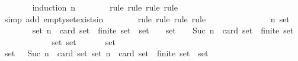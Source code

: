 \begin{isabellebody}
\ \ \ \ \ \ \isamarkupfalse%
\ {\isacharparenleft}induction\ n{\isacharparenright}\isanewline
\ \ \ \ \ \ \isamarkupfalse%
\ {\isacharparenleft}rule{\isacharcomma}\ rule{\isacharcomma}\ rule{\isacharcomma}\ rule{\isacharparenright}\isanewline
\ \ \ \ \ \ \ \isamarkupfalse%
\ {\isacharparenleft}simp\ add{\isacharcolon}\ empty{\isacharunderscore}set{\isacharunderscore}exists{\isacharunderscore}in{\isacharunderscore}{\isasymSigma}{\isacharparenright}\isanewline
\ \ \ \ \ \ \isamarkupfalse%
\ {\isacharparenleft}rule{\isacharcomma}\ rule{\isacharcomma}\ rule{\isacharcomma}\ rule{\isacharparenright}\isanewline
\ \ \ \ \isamarkupfalse%
\ {\isacharminus}\ \isanewline
\ \ \ \ \ \ \isamarkupfalse%
\ n\ {\isasymsigma}{\isacharunderscore}set\isanewline
\ \ \ \ \ \ \isamarkupfalse%
\ {\isachardoublequoteopen}{\isasymforall}{\isasymsigma}{\isacharunderscore}set{\isasymsubseteq}{\isasymSigma}{\isachardot}\ n\ {\isacharequal}\ card\ {\isasymsigma}{\isacharunderscore}set\ {\isasymlongrightarrow}\ finite\ {\isasymsigma}{\isacharunderscore}set\ {\isasymlongrightarrow}\ {\isasymUnion}{\isasymsigma}{\isacharunderscore}set\ {\isasymin}\ {\isasymSigma}{\isachardoublequoteclose}\ \ {\isachardoublequoteopen}{\isasymsigma}{\isacharunderscore}set\ {\isasymsubseteq}\ {\isasymSigma}{\isachardoublequoteclose}\ \ {\isachardoublequoteopen}Suc\ n\ {\isacharequal}\ card\ {\isasymsigma}{\isacharunderscore}set{\isachardoublequoteclose}\ \ {\isachardoublequoteopen}finite\ {\isasymsigma}{\isacharunderscore}set{\isachardoublequoteclose}\ \isanewline
\ \ \ \ \ \ \isamarkupfalse%
\ \isamarkupfalse%
\ {\isachardoublequoteopen}{\isasymforall}\ {\isasymsigma}\ {\isasymin}\ {\isasymsigma}{\isacharunderscore}set{\isachardot}\ {\isasymsigma}{\isacharunderscore}set\ {\isacharminus}\ {\isacharbraceleft}{\isasymsigma}{\isacharbraceright}\ {\isasymsubseteq}\ {\isasymSigma}\ {\isasymand}\ {\isasymUnion}\ {\isacharparenleft}{\isasymsigma}{\isacharunderscore}set\ {\isacharminus}\ {\isacharbraceleft}{\isasymsigma}{\isacharbraceright}{\isacharparenright}\ {\isasymin}\ {\isasymSigma}{\isachardoublequoteclose}\isanewline
\ \ \ \ \ \ \ \ \isamarkupfalse%
\ {\isacartoucheopen}{\isasymsigma}{\isacharunderscore}set\ {\isasymsubseteq}\ {\isasymSigma}{\isacartoucheclose}\ {\isacartoucheopen}Suc\ n\ {\isacharequal}\ card\ {\isasymsigma}{\isacharunderscore}set{\isacartoucheclose}\ {\isacartoucheopen}{\isasymforall}{\isasymsigma}{\isacharunderscore}set{\isasymsubseteq}{\isasymSigma}{\isachardot}\ n\ {\isacharequal}\ card\ {\isasymsigma}{\isacharunderscore}set\ {\isasymlongrightarrow}\ finite\ {\isasymsigma}{\isacharunderscore}set\ {\isasymlongrightarrow}\ {\isasymUnion}{\isasymsigma}{\isacharunderscore}set\ {\isasymin}\ {\isasymSigma}{\isacartoucheclose}\isanewline

\end{isabellebody}
